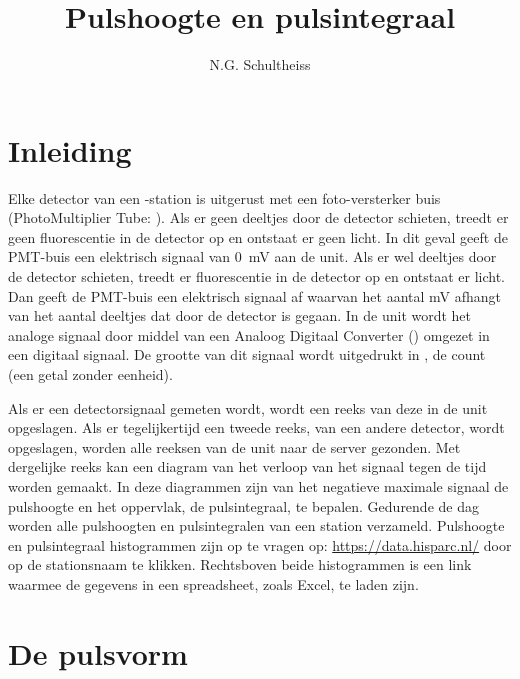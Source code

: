 

\title{Pulshoogte en pulsintegraal}
\author{N.G. Schultheiss}



\maketitle

\section{Inleiding}

Elke detector van een \hisparc-station is uitgerust met een
foto-versterker buis (PhotoMultiplier Tube: \pmt). Als er geen deeltjes
door de detector schieten, treedt er geen fluorescentie in de detector
op en ontstaat er geen licht. In dit geval geeft de PMT-buis een
elektrisch signaal van \SI{0}{\milli\volt} aan de \hisparc unit. Als er
wel deeltjes door de detector schieten, treedt er fluorescentie in de
detector op en ontstaat er licht. Dan geeft de PMT-buis een elektrisch
signaal af waarvan het aantal mV afhangt van het aantal deeltjes dat
door de detector is gegaan. In de \hisparc unit wordt het analoge
signaal door middel van een Analoog Digitaal Converter (\adc) omgezet in
een digitaal signaal. De grootte van dit signaal wordt uitgedrukt in
\adcs, de \adc count (een getal zonder eenheid).

Als er een detectorsignaal gemeten wordt, wordt een reeks van deze \adcs
in de \hisparc unit opgeslagen. Als er tegelijkertijd een tweede reeks,
van een andere detector, wordt opgeslagen, worden alle reeksen \adcs van
de \hisparc unit naar de \hisparc server gezonden. Met dergelijke reeks
kan een diagram van het verloop van het signaal tegen de tijd worden
gemaakt. In deze diagrammen zijn van het negatieve maximale signaal de
pulshoogte en het oppervlak, de pulsintegraal, te bepalen. Gedurende de
dag worden alle pulshoogten en pulsintegralen van een station verzameld.
Pulshoogte en pulsintegraal histogrammen zijn op te vragen op:
\url{https://data.hisparc.nl/} door op de stationsnaam te klikken.
Rechtsboven beide histogrammen is een link waarmee de gegevens in een
spreadsheet, zoals Excel, te laden zijn.


\section{De pulsvorm}


